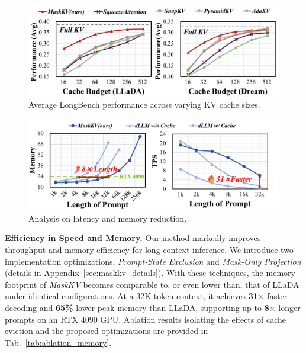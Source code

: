 \begin{figure}[t]
  \centering
  \includegraphics[width=\columnwidth]{figure/across_budget_new.pdf}
  \caption{Average LongBench performance across varying KV cache sizes.}
  \label{fig:across_size}
\end{figure}
\begin{figure}[t]
  \centering
  \includegraphics[width=\columnwidth]{figure/efficiency_new.pdf}
  \caption{Analysis on latency and memory reduction.}
  \label{fig:efficiency}
\end{figure}

\noindent \textbf{Efficiency in Speed and Memory.}
Our method markedly improves throughput and memory efficiency for long-context inference. 
We introduce two implementation optimizations, \textit{Prompt-State Exclusion} and \textit{Mask-Only Projection} (details in Appendix~\ref{sec:maskkv_details}). 
With these techniques, the memory footprint of \emph{MaskKV} becomes comparable to, or even lower than, that of LLaDA under identical configurations. 
At a 32K-token context, it achieves \textbf{31$\times$} faster decoding and \textbf{65\%} lower peak memory than LLaDA, supporting up to \textbf{8$\times$} longer prompts on an RTX 4090 GPU. 
Ablation results isolating the effects of cache eviction and the proposed optimizations are provided in Tab.~\ref{tab:ablation_memory}.

